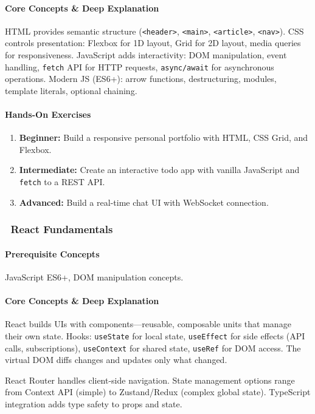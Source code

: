 \documentclass[11pt, a4paper, oneside]{report}
\newcommand{\mustmaster}[1]{\subsubsection{\texorpdfstring{\fcolorbox{blue!40!black}{blue!8}{\footnotesize\bfseries\color{blue!40!black} MUST MASTER}~#1}{#1}}}
\begin{document}
\paragraph{Core Concepts \& Deep Explanation} HTML provides semantic structure (\texttt{<header>}, \texttt{<main>}, \texttt{<article>}, \texttt{<nav>}). CSS controls presentation: Flexbox for 1D layout, Grid for 2D layout, media queries for responsiveness. JavaScript adds interactivity: DOM manipulation, event handling, \texttt{fetch} API for HTTP requests, \texttt{async/await} for asynchronous operations. Modern JS (ES6+): arrow functions, destructuring, modules, template literals, optional chaining.

\paragraph{Hands-On Exercises}
\begin{enumerate}[leftmargin=*]
\item \textbf{Beginner:} Build a responsive personal portfolio with HTML, CSS Grid, and Flexbox.
\item \textbf{Intermediate:} Create an interactive todo app with vanilla JavaScript and \texttt{fetch} to a REST API.
\item \textbf{Advanced:} Build a real-time chat UI with WebSocket connection.
\end{enumerate}

\mustmaster{React Fundamentals}

\paragraph{Prerequisite Concepts} JavaScript ES6+, DOM manipulation concepts.

\paragraph{Core Concepts \& Deep Explanation} React builds UIs with components---reusable, composable units that manage their own state. Hooks: \texttt{useState} for local state, \texttt{useEffect} for side effects (API calls, subscriptions), \texttt{useContext} for shared state, \texttt{useRef} for DOM access. The virtual DOM diffs changes and updates only what changed.

React Router handles client-side navigation. State management options range from Context API (simple) to Zustand/Redux (complex global state). TypeScript integration adds type safety to props and state.
\end{document}
